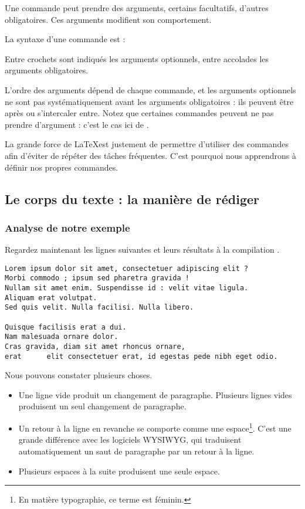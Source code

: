 Une commande peut prendre des arguments, certains facultatifs, d'autres obligatoires. Ces arguments  modifient son comportement.

La syntaxe d'une commande est : \label{syntaxecommande}



Entre crochets sont indiqués les arguments optionnels, entre accolades les arguments obligatoires.


L'ordre des arguments dépend de chaque commande, et les arguments optionnels ne sont pas systématiquement avant les arguments obligatoires : ils peuvent être après ou s'intercaler entre. Notez que certaines commandes peuvent ne pas prendre d'argument : c'est le cas ici de .

La grande force de \LaTeX est justement de permettre d'utiliser des commandes afin d'éviter de répéter des tâches fréquentes. C'est pourquoi nous apprendrons à définir nos propres commandes.



\subsection{Le corps du texte : la manière de rédiger}

\subsubsection{Analyse de notre exemple}
Regardez maintenant les lignes suivantes et leurs résultats à la compilation .


\begin{verbatim}
Lorem ipsum dolor sit amet, consectetuer adipiscing elit ?
Morbi commodo ; ipsum sed pharetra gravida !
Nullam sit amet enim. Suspendisse id : velit vitae ligula.
Aliquam erat volutpat.
Sed quis velit. Nulla facilisi. Nulla libero. 

Quisque facilisis erat a dui.
Nam malesuada ornare dolor.
Cras gravida, diam sit amet rhoncus ornare, 
erat      elit consectetuer erat, id egestas pede nibh eget odio.
\end{verbatim}


Nous pouvons constater plusieurs choses.
\begin{itemize}
\item Une ligne vide produit un changement de paragraphe. Plusieurs lignes vides produisent un seul changement de paragraphe.
\item Un retour à la ligne en revanche se comporte comme une espace\footnote{En matière typographie, ce terme est féminin.}. C'est une grande différence avec les logiciels WYSIWYG, qui traduisent automatiquement un saut de paragraphe par un retour à la ligne.
\item Plusieurs espaces à la suite produisent une seule espace. 
\end{itemize}

